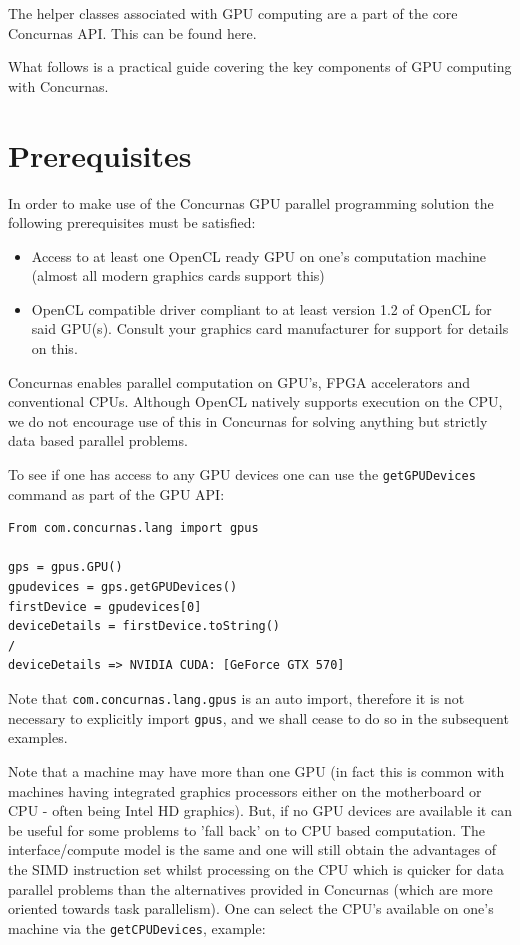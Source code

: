 \documentclass[conc-doc]{subfiles}
\begin{document}
The helper classes associated with GPU computing are a part of the core Concurnas API. This can be found here.

What follows is a practical guide covering the key components of GPU computing with Concurnas.

\section{Prerequisites}
In order to make use of the Concurnas GPU parallel programming solution the following prerequisites must be satisfied:

\begin{itemize}
	\item Access to at least one OpenCL ready GPU on one's computation machine (almost all modern graphics cards support this)
	\item OpenCL compatible driver compliant to at least version 1.2 of OpenCL for said GPU(s). Consult your graphics card manufacturer for support for details on this.
\end{itemize}


Concurnas enables parallel computation on GPU's, FPGA accelerators and conventional CPUs. Although OpenCL natively supports execution on the CPU, we do not encourage use of this in Concurnas for solving anything but strictly data based parallel problems.

To see if one has access to any GPU devices one can use the \lstinline{getGPUDevices} command as part of the GPU API:

\begin{lstlisting}
From com.concurnas.lang import gpus

gps = gpus.GPU()
gpudevices = gps.getGPUDevices()
firstDevice = gpudevices[0]
deviceDetails = firstDevice.toString()
/
deviceDetails => NVIDIA CUDA: [GeForce GTX 570]
\end{lstlisting}

Note that \lstinline{com.concurnas.lang.gpus} is an auto import, therefore it is not necessary to explicitly import \lstinline{gpus}, and we shall cease to do so in the subsequent examples.

Note that a machine may have more than one GPU (in fact this is common with machines having integrated graphics processors either on the motherboard or CPU - often being Intel HD graphics). But, if no GPU devices are available it can be useful for some problems to 'fall back' on to CPU based computation. The interface/compute model is the same and one will still obtain the advantages of the SIMD instruction set whilst processing on the CPU which is quicker for data parallel problems than the alternatives provided in Concurnas (which are more oriented towards task parallelism). One can select the CPU's available on one's machine via the \lstinline{getCPUDevices}, example:
\end{document}
